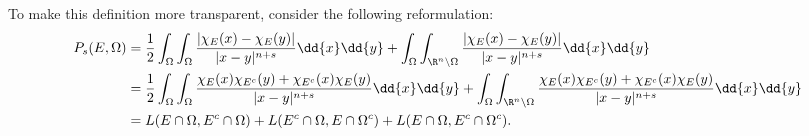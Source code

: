 \documentclass[../main.tex]{subfiles}
\begin{document}
To make this definition more transparent, consider the following reformulation:
\begin{align*}
    P_{s}(E, \Omega) &= \frac{1}{2}\int_{\Omega}\int_{\Omega} \frac{|\chi_{E}(x)-\chi_{E}(y)|}{|x-y|^{n+s}}\dd{x}\dd{y} +  \int_{\Omega}\int_{\R^{n}\setminus \Omega} \frac{| \chi_{E}(x) - \chi_{E}(y)|}{|x-y|^{n+s}}\dd{x}\dd{y} \\
    &= \frac{1}{2}\int_{\Omega}\int_{\Omega} \frac{\chi_{E}(x) \chi_{E^{c}}(y) + \chi_{E^{c}}(x) \chi_{E}(y)}{|x-y|^{n+s}}\dd{x}\dd{y} +  \int_{\Omega}\int_{\R^{n}\setminus \Omega} \frac{\chi_{E}(x) \chi_{E^{c}}(y) + \chi_{E^{c}}(x) \chi_{E}(y)}{|x-y|^{n+s}}\dd{x}\dd{y}\\
    &= L(E\cap \Omega, E^{c} \cap \Omega) + L(E^{c}\cap \Omega, E\cap \Omega^{c}) + L(E\cap \Omega, E^{c}\cap \Omega^{c}).
\end{align*}

\begin{figure}[H]
    
\end{figure}


%




%
%

%
%

\end{document}
